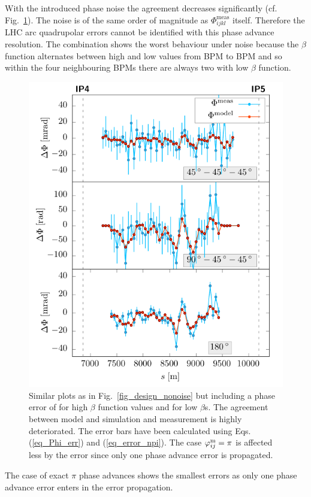 With the introduced phase noise the agreement decreases significantly (cf. Fig.~\ref{fig_design_noise}). The noise is of the same order of magnitude
as $\Phi_{ijkl}^\text{meas}$ itself.
Therefore the LHC arc quadrupolar errors cannot be identified with this phase advance resolution.
The combination  shows the worst behaviour under noise because the $\beta$
function alternates between high and low values from BPM to BPM and so within the four neighbouring
BPMs there are always two with low $\beta$ function.
%
\begin{figure}
  \centering
  \includegraphics[width=.8\linewidth]{sim_noise} %
  \caption{
    Similar plots as in Fig.~\ref{fig_design_nonoise} but including a phase error of \noiserms{} for
    high $\beta$ function values and \highnoise{} for low $\beta$s.
    The agreement between model and simulation and measurement is highly deteriorated.
    The error bars have been calculated using Eqs. (\ref{eq_Phi_err}) and (\ref{eq_error_npi}).
    The case $\varphi_{ij}^\text{m}=\pi$ is affected less by the error since only one phase advance error
    is propagated.
  }
  \label{fig_design_noise}
\end{figure}
%
The case of exact $\pi$ phase advances shows the smallest errors as only one phase advance
error enters in the error propagation.

